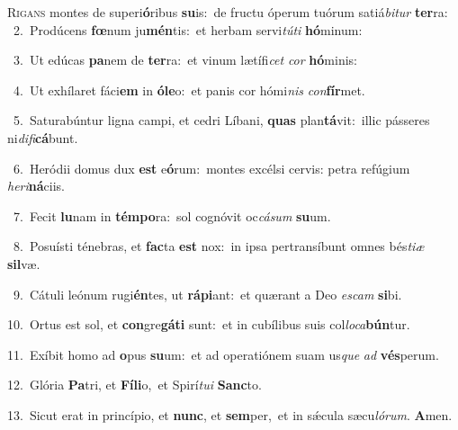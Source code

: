 \lettrine{\initial\textcolor{\initialcolor}{R}}{igans} montes de superi\-\textbf{ó}\-ribus \textbf{su}\-is:~\star de fructu óperum tuórum satiá\-\textit{bi}\-\textit{tur} \textbf{ter}\-ra:\\
{\numbfont\textcolor{\numbcolor}{~2.}}~Prodúcens \textbf{fœ}\-num ju\-\textbf{mén}\-tis:~\star et herbam servi\-\textit{tú}\-\textit{ti} \textbf{hó}\-minum:\par
{\numbfont\textcolor{\numbcolor}{~3.}}~Ut edúcas \textbf{pa}\-nem de \textbf{ter}\-ra:~\star et vinum lætífi\textit{cet} \textit{cor} \textbf{hó}\-minis:\par
{\numbfont\textcolor{\numbcolor}{~4.}}~Ut exhílaret fáci\textbf{em} in \textbf{ó}\-\textbf{le}o:~\star et panis cor hómi\textit{nis} \textit{con}\-\textbf{fír}met.\par
{\numbfont\textcolor{\numbcolor}{~5.}}~Saturabúntur ligna campi, et cedri Líbani, \textbf{quas} plan\-\textbf{tá}\-vit:~\star illic pásseres ni\-\textit{di}\-\textit{fi}\textbf{cá}bunt.\par
{\numbfont\textcolor{\numbcolor}{~6.}}~Heródii domus dux \textbf{est} e\-\textbf{ó}\-rum:~\star montes excélsi cervis: petra refúgium \textit{he}\-\textit{ri}\textbf{ná}ciis.\par
{\numbfont\textcolor{\numbcolor}{~7.}}~Fecit \textbf{lu}\-nam in \textbf{tém}\-\textbf{po}ra:~\star sol cognóvit oc\-\textit{cá}\-\textit{sum} \textbf{su}\-um.\par
{\numbfont\textcolor{\numbcolor}{~8.}}~Posuísti ténebras, et \textbf{fac}\-ta \textbf{est} nox:~\star in ipsa pertransíbunt omnes bés\-\textit{ti}\-\textit{æ} \textbf{sil}\-væ.\par
{\numbfont\textcolor{\numbcolor}{~9.}}~Cátuli leónum rugi\-\textbf{én}\-tes, ut \textbf{rá}\-\textbf{pi}ant:~\star et quærant a Deo \textit{es}\-\textit{cam} \textbf{si}\-bi.\par
{\numbfont\textcolor{\numbcolor}{10.}}~Ortus est sol, et \textbf{con}\-gre\-\textbf{gá}\-\textbf{ti} sunt:~\star et in cubílibus suis col\-\textit{lo}\-\textit{ca}\textbf{bún}tur.\par
{\numbfont\textcolor{\numbcolor}{11.}}~Exíbit homo ad \textbf{o}\-pus \textbf{su}\-um:~\star et ad operatiónem suam us\textit{que} \textit{ad} \textbf{vés}\-perum.\par
{\numbfont\textcolor{\numbcolor}{12.}}~Glória \textbf{Pa}\-tri, et \textbf{Fí}\-\textbf{li}o,~\star et Spirí\-\textit{tu}\-\textit{i} \textbf{Sanc}\-to.\par
{\numbfont\textcolor{\numbcolor}{13.}}~Sicut erat in princípio, et \textbf{nunc}\-, et \textbf{sem}\-per,~\star et in sǽcula sæcu\-\textit{ló}\-\textit{rum}. \textbf{A}\-men.\par
